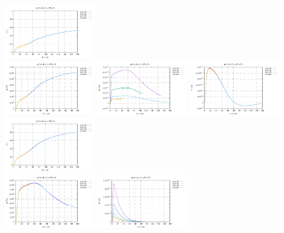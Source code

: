 \begin{center}
\includegraphics[width=4cm]{python_codes/fieldstone_126/results/model3/pt2_Ovp.pdf}\\
\includegraphics[width=4cm]{python_codes/fieldstone_126/results/model3/pt3_p.pdf}
\includegraphics[width=4cm]{python_codes/fieldstone_126/results/model3/pt3_u.pdf}
\includegraphics[width=4cm]{python_codes/fieldstone_126/results/model3/pt3_v.pdf}
\includegraphics[width=4cm]{python_codes/fieldstone_126/results/model3/pt3_Ovp.pdf}\\
\includegraphics[width=4cm]{python_codes/fieldstone_126/results/model3/pt4_p.pdf}
\includegraphics[width=4cm]{python_codes/fieldstone_126/results/model3/pt4_u.pdf}

\end{center}
